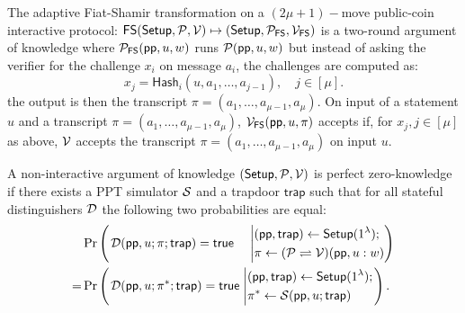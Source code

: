 \begin{definition}
	The adaptive Fiat-Shamir transformation on a $(2\mu + 1)-$move public-coin interactive protocol: $\mathsf{FS}({\sf Setup}, \mathcal{P}, \mathcal{V}) \mapsto ({\sf Setup}, \mathcal{P}_\mathsf{FS}, \mathcal{V}_{\mathsf{FS}})$ is a two-round argument of knowledge where $\mathcal{P}_\mathsf{FS}({\sf pp}, u, w)$ runs $\mathcal{P}({\sf pp}, u, w)$ but instead of asking the verifier for the challenge $x_i$ on message $a_i$, the challenges are computed as: 
	\begin{equation*}
		x_j = \mathsf{Hash}_i(u, a_1, \ldots, a_{j - 1}), \quad j \in [\mu].
	\end{equation*}
the output is then the transcript $\pi = (a_1, \ldots, a_{\mu - 1}, a_{\mu})$.
On input of a statement $u$ and a transcript $\pi = (a_1, \ldots, a_{\mu -1 }, a_{\mu}) $, $\mathcal{V}_{\mathsf{FS}}({\sf pp}, u, \pi)$ accepts if, for $x_j, j \in [\mu]$ as above, $\mathcal{V}$ accepts the transcript $\pi = (a_1, \ldots, a_{\mu - 1}, a_{\mu})$ on input $u$.
\end{definition}


\begin{definition}
\label{def: perfectZeroKnowledge}
	A non-interactive argument of knowledge $({\sf Setup}, \mathcal{P}, \mathcal{V})$ is perfect zero-knowledge~\cite{eurocrypt/Groth16} if there exists a PPT simulator $\mathcal{S}$ and a trapdoor $\mathsf{trap}$ such that for all stateful distinguishers $\mathcal{D}$ the following two probabilities are equal:
	\begin{equation*}
		\left.
			\begin{aligned}
			&
			\Pr
			\left(
				\left.
					\begin{aligned}
						& \mathcal{D}({\sf pp}, u; \pi; \mathsf{trap}) = {\sf true} 
					\end{aligned}
				\right.
				\left |
					\begin{aligned}
						& ({\sf pp}, \mathsf{trap}) \leftarrow {\sf Setup}(1^{\lambda}); \\
						& \pi \leftarrow {(\mathcal{P} \rightleftharpoons \mathcal{V})} ({\sf pp}, u: w)
					\end{aligned}
				\right)
			\right.
			\\
			= & 
			\Pr
			\left(
				\left.
					\begin{aligned}
						& \mathcal{D}( {\sf pp}, u; \pi^*; \mathsf{trap}) = {\sf true} \\
					\end{aligned}
				\right.
				\left |
					\begin{aligned}
						& ({\sf pp}, \mathsf{trap}) \leftarrow {\sf Setup}(1^{\lambda}); \\
						& \pi^* \leftarrow \mathcal{S} ({\sf pp}, u; \mathsf{trap})
					\end{aligned}
				\right.
			\right).
			\end{aligned}
		\right.
	\end{equation*}
\end{definition}

